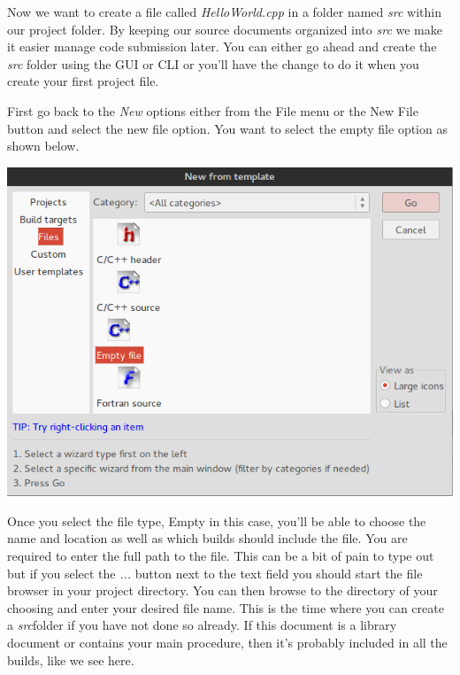 \documentclass[10pt]{article}
\begin{document}
Now we want to create a file called \textit{HelloWorld.cpp} in a folder named \textit{src} within our project folder. By keeping our source documents organized into \textit{src} we make it easier manage code submission later. You can either go ahead and create the \textit{src} folder using the GUI or CLI or you'll have the change to do it when you create your first project file.

First go back to the \textit{New} options either from the File menu or the New File button and select the new file option. You want to select the empty file option as shown below.

\vspace{.1in}
\begin{center}
\includegraphics[scale=.5]{CB_NewFileEmptyCPP.png}
\end{center}
\vspace{.1in}

Once you select the file type, Empty in this case, you'll be able to choose the name and location as well as which builds should include the file. You are required to enter the full path to the file. This can be a bit of pain to type out but if you select the \textit{...} button next to the text field you should start the file browser in your project directory. You can then browse to the directory of your choosing and enter your desired file name. This is the time where you can create a \textit{src}folder if you have not done so already. If this document is a library document or contains your main procedure, then it's probably included in all the builds, like we see here. 
\end{document}
